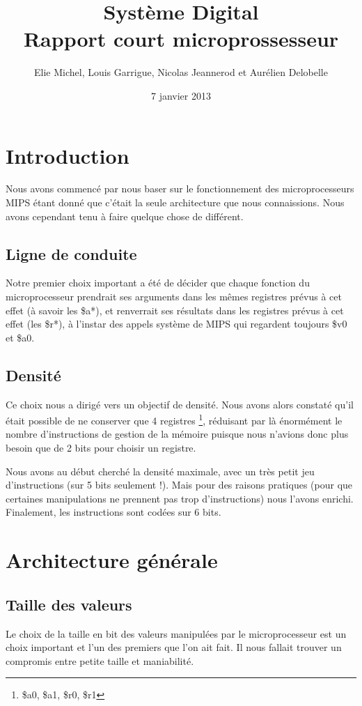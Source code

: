 \documentclass{article}
\title{Système Digital\\Rapport court microprossesseur}
\author{Elie Michel, Louis Garrigue, Nicolas Jeannerod et Aurélien Delobelle}
\date{7 janvier 2013}
\begin{document}
\maketitle

\section{Introduction}

Nous avons commencé par nous baser sur le fonctionnement des microprocesseurs
MIPS étant donné que c'était la seule architecture que nous connaissions.
Nous avons cependant tenu à faire quelque chose de différent.

\subsection{Ligne de conduite}
Notre premier choix important a été de décider que chaque fonction du
microprocesseur prendrait ses arguments dans les mêmes registres prévus à cet effet
(à savoir les \$a*), et renverrait ses résultats dans les registres prévus à
cet effet (les \$r*), à l'instar des appels système de MIPS qui regardent
toujours \$v0 et \$a0.

\subsection{Densité}
Ce choix nous a dirigé vers un objectif de densité. Nous avons alors constaté
qu'il était possible de ne conserver que 4 registres
\footnote{\$a0, \$a1, \$r0, \$r1}, réduisant par là énormément le nombre
d'instructions de gestion de la mémoire puisque nous n'avions donc  plus besoin
que de 2 bits pour choisir un registre.

Nous avons au début cherché la densité maximale, avec un très petit jeu
d'instructions (sur 5 bits seulement !).
Mais pour des raisons pratiques (pour que certaines manipulations ne prennent pas
trop d'instructions) nous l'avons enrichi. Finalement, les instructions sont
codées sur 6 bits.


\section{Architecture générale}

\subsection{Taille des valeurs}
Le choix de la taille en bit des valeurs manipulées par le microprocesseur est
un choix important et l'un des premiers que l'on ait fait. Il nous fallait trouver
un compromis entre petite taille et maniabilité.
\end{document}
